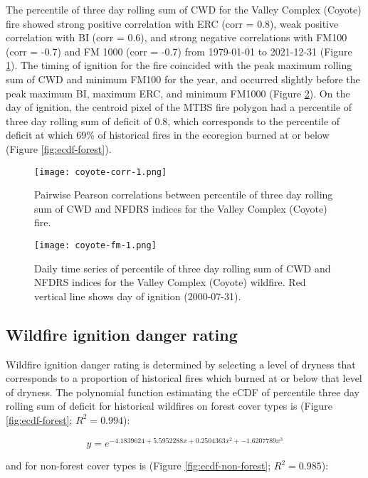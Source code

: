 \documentclass[11p]{article}
\begin{document}
The percentile of three day rolling sum of CWD for the Valley Complex (Coyote) fire showed strong positive correlation with ERC (corr = 0.8), weak positive correlation with BI (corr = 0.6), and strong negative correlations with FM100 (corr = -0.7) and FM 1000 (corr = -0.7) from 1979-01-01 to 2021-12-31 (Figure \ref{fig:coyote-corrplot}). The timing of ignition for the fire coincided with the peak maximum rolling sum of CWD and minimum FM100 for the year, and occurred slightly before the peak maximum BI, maximum ERC, and minimum FM1000 (Figure \ref{fig:coyote-fm}). On the day of ignition, the centroid pixel of the MTBS fire polygon had a percentile of three day rolling sum of deficit of 0.8, which corresponds to the percentile of deficit at which 69\% of historical fires in the ecoregion burned at or below (Figure \ref{fig:ecdf-forest}).

\begin{figure}[htbp]
  \centering
  \texttt{[image: coyote-corr-1.png]}
  \caption{Pairwise Pearson correlations between percentile of three day rolling sum of CWD and NFDRS indices for the Valley Complex (Coyote) fire.}
  \label{fig:coyote-corrplot}
\end{figure}


\begin{figure}[htbp]
  \centering
  \texttt{[image: coyote-fm-1.png]}
  \caption{Daily time series of percentile of three day rolling sum of CWD and NFDRS indices for the Valley Complex (Coyote) wildfire. Red vertical line shows day of ignition (2000-07-31).}
  \label{fig:coyote-fm}
\end{figure}

\subsection{Wildfire ignition danger rating}

Wildfire ignition danger rating is determined by selecting a level of dryness that corresponds to a proportion of historical fires which burned at or below that level of dryness. The polynomial function estimating the eCDF of percentile three day rolling sum of deficit for historical wildfires on forest cover types is (Figure \ref{fig:ecdf-forest}; $R^2 = 0.994$):

\begin{equation*}
  y = e^{-4.1839624 + 5.5952288x + 0.2504363x^2 + -1.6207789x^3}
\end{equation*}

and for non-forest cover types is (Figure \ref{fig:ecdf-non-forest}; $R^2=0.985$):
\end{document}
